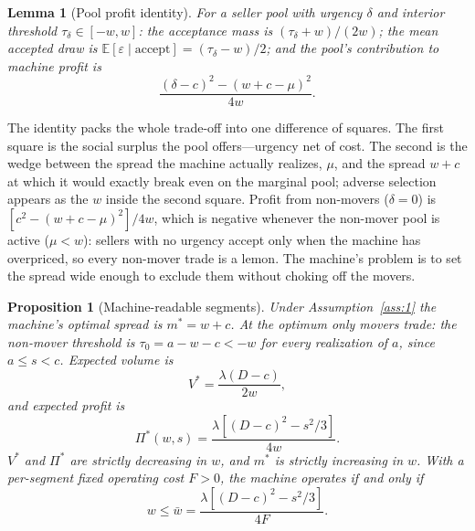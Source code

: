 \documentclass[12pt, letterpaper]{article}
\newtheorem{proposition}{Proposition}
\newtheorem{lemma}{Lemma}
\theoremstyle{remark}
\newcommand{\E}{\mathbb{E}}
\begin{document}
\begin{lemma}[Pool profit identity]\label{lem:pool}
For a seller pool with urgency $\delta$ and interior threshold $\tau_\delta \in [-w, w]$: the acceptance mass is $(\tau_\delta + w)/(2w)$; the mean accepted draw is $\E[\varepsilon \mid \text{accept}] = (\tau_\delta - w)/2$; and the pool's contribution to machine profit is
\begin{equation}
\frac{(\delta - c)^2 - (w + c - \mu)^2}{4w}.
\label{eq:poolprofit}
\end{equation}
\end{lemma}

The identity packs the whole trade-off into one difference of squares. The first square is the social surplus the pool offers---urgency net of cost. The second is the wedge between the spread the machine actually realizes, $\mu$, and the spread $w + c$ at which it would exactly break even on the marginal pool; adverse selection appears as the $w$ inside the second square. Profit from non-movers ($\delta = 0$) is $[c^2 - (w+c-\mu)^2]/4w$, which is negative whenever the non-mover pool is active ($\mu < w$): sellers with no urgency accept only when the machine has overpriced, so every non-mover trade is a lemon. The machine's problem is to set the spread wide enough to exclude them without choking off the movers.

\begin{proposition}[Machine-readable segments]\label{prop:sorting}
Under Assumption~\ref{ass:1} the machine's optimal spread is $m^* = w + c$. At the optimum only movers trade: the non-mover threshold is $\tau_0 = a - w - c < -w$ for every realization of $a$, since $a \le s < c$. Expected volume is
\begin{equation}
V^* = \frac{\lambda (D - c)}{2w},
\label{eq:volume}
\end{equation}
and expected profit is
\begin{equation}
\Pi^*(w, s) = \frac{\lambda \left[ (D-c)^2 - s^2/3 \right]}{4w}.
\label{eq:profit}
\end{equation}
$V^*$ and $\Pi^*$ are strictly decreasing in $w$, and $m^*$ is strictly increasing in $w$. With a per-segment fixed operating cost $F > 0$, the machine operates if and only if
\begin{equation}
w \le \bar w = \frac{\lambda \left[ (D-c)^2 - s^2/3 \right]}{4F}.
\label{eq:wbar}
\end{equation}
\end{proposition}
\end{document}
